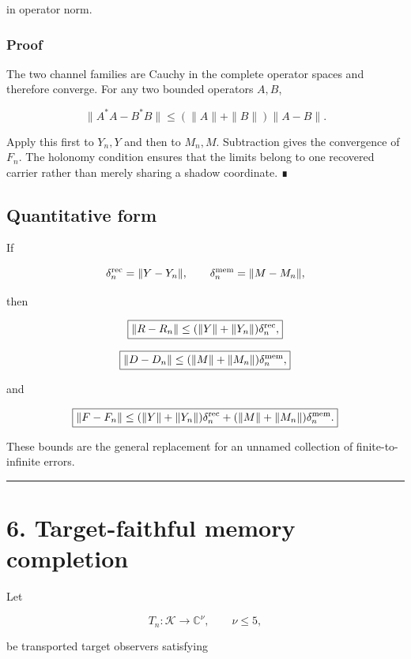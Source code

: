 in operator norm.

\hypertarget{proof}{%
\subsubsection{Proof}\label{proof}}

The two channel families are Cauchy in the complete operator spaces and therefore
converge. For any two bounded operators \(A,B\),

\[
\|A^*A-B^*B\|
\le
(\|A\|+\|B\|)\|A-B\|.
\]

Apply this first to \(Y_n,Y\) and then to \(M_n,M\). Subtraction gives the
convergence of \(F_n\). The holonomy condition ensures that the limits belong
to one recovered carrier rather than merely sharing a shadow coordinate. ∎

\hypertarget{quantitative-form}{%
\subsection{Quantitative form}\label{quantitative-form}}

If

\[
\delta_n^{\rm rec}=\|Y-Y_n\|,
\qquad
\delta_n^{\rm mem}=\|M-M_n\|,
\]

then

\[
\boxed{
\|R-R_n\|
\le
(\|Y\|+\|Y_n\|)\delta_n^{\rm rec},
}
\]

\[
\boxed{
\|D-D_n\|
\le
(\|M\|+\|M_n\|)\delta_n^{\rm mem},
}
\]

and

\[
\boxed{
\|F-F_n\|
\le
(\|Y\|+\|Y_n\|)\delta_n^{\rm rec}
+
(\|M\|+\|M_n\|)\delta_n^{\rm mem}.
}
\]

These bounds are the general replacement for an unnamed collection of finite-to-
infinite errors.

\begin{center}\rule{0.5\linewidth}{0.5pt}\end{center}

\hypertarget{target-faithful-memory-completion}{%
\section{6. Target-faithful memory completion}\label{target-faithful-memory-completion}}

Let

\[
T_n:\mathcal K\longrightarrow\mathbb C^\nu,
\qquad \nu\le5,
\]

be transported target observers satisfying

